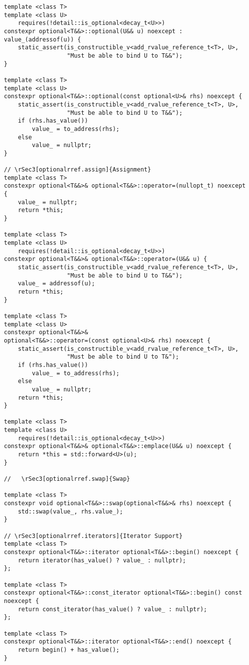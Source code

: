 \documentclass[a4paper,10pt,oneside,openany,final,article]{memoir}
\begin{document}
\begin{verbatim}
template <class T>
template <class U>
    requires(!detail::is_optional<decay_t<U>>)
constexpr optional<T&&>::optional(U&& u) noexcept : value_(addressof(u)) {
    static_assert(is_constructible_v<add_rvalue_reference_t<T>, U>,
                  "Must be able to bind U to T&&");
}

template <class T>
template <class U>
constexpr optional<T&&>::optional(const optional<U>& rhs) noexcept {
    static_assert(is_constructible_v<add_rvalue_reference_t<T>, U>,
                  "Must be able to bind U to T&&");
    if (rhs.has_value())
        value_ = to_address(rhs);
    else
        value_ = nullptr;
}

// \rSec3[optionalrref.assign]{Assignment}
template <class T>
constexpr optional<T&&>& optional<T&&>::operator=(nullopt_t) noexcept {
    value_ = nullptr;
    return *this;
}

template <class T>
template <class U>
    requires(!detail::is_optional<decay_t<U>>)
constexpr optional<T&&>& optional<T&&>::operator=(U&& u) {
    static_assert(is_constructible_v<add_rvalue_reference_t<T>, U>,
                  "Must be able to bind U to T&&");
    value_ = addressof(u);
    return *this;
}

template <class T>
template <class U>
constexpr optional<T&&>&
optional<T&&>::operator=(const optional<U>& rhs) noexcept {
    static_assert(is_constructible_v<add_rvalue_reference_t<T>, U>,
                  "Must be able to bind U to T&");
    if (rhs.has_value())
        value_ = to_address(rhs);
    else
        value_ = nullptr;
    return *this;
}

template <class T>
template <class U>
    requires(!detail::is_optional<decay_t<U>>)
constexpr optional<T&&>& optional<T&&>::emplace(U&& u) noexcept {
    return *this = std::forward<U>(u);
}

//   \rSec3[optionalrref.swap]{Swap}

template <class T>
constexpr void optional<T&&>::swap(optional<T&&>& rhs) noexcept {
    std::swap(value_, rhs.value_);
}

// \rSec3[optionalrref.iterators]{Iterator Support}
template <class T>
constexpr optional<T&&>::iterator optional<T&&>::begin() noexcept {
    return iterator(has_value() ? value_ : nullptr);
};

template <class T>
constexpr optional<T&&>::const_iterator optional<T&&>::begin() const noexcept {
    return const_iterator(has_value() ? value_ : nullptr);
};

template <class T>
constexpr optional<T&&>::iterator optional<T&&>::end() noexcept {
    return begin() + has_value();
}


\end{verbatim}
\end{document}
